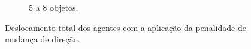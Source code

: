 \begin{figure}[h]
\begin{subfigure}[t]{0.49\textwidth}
    \caption{5 a 8 objetos.}
  \end{subfigure}
  \caption{Deslocamento total dos agentes com a aplicação da penalidade de mudança de direção.}
  \label{fig:ambiente_penalizacao_deslocamento_com}
\end{figure}



